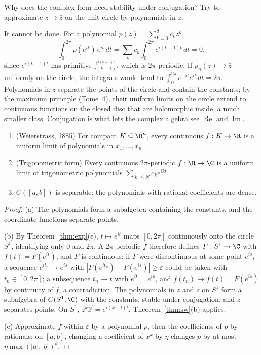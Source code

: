 \begin{think}
Why does the complex form need stability under conjugation? Try to approximate $z\mapsto\bar z$ on the unit circle by polynomials in $z$.
\end{think}

It cannot be done. For a polynomial $p(z)=\sum_{k=0}^dc_kz^k$,
\[\int_0^{2\pi}p(e^{it})\,e^{it}\,dt=\sum_kc_k\int_0^{2\pi}e^{i(k+1)t}\,dt=0,\]
since $e^{i(k+1)t}$ has primitive $\frac{e^{i(k+1)t}}{i(k+1)}$, which is $2\pi$-periodic. If $p_n(z)\to\bar z$ uniformly on the circle, the integrals would tend to
$\int_0^{2\pi}e^{-it}e^{it}\,dt=2\pi$. Polynomials in $z$ separate the points of the circle and contain the constants; by the maximum principle (Tome~4), their uniform limits on the circle
extend to continuous functions on the closed disc that are holomorphic inside, a much smaller class. Conjugation is what lets the complex
algebra see $\operatorname{Re}$ and $\operatorname{Im}$.

\begin{corollary}\label{cor:weierstrass}
\begin{enumerate}[label=(\alph*)]
\item (Weierstrass, 1885) For compact $K\subseteq\R^n$, every continuous $f:K\to\R$ is a uniform limit of polynomials in $x_1,\dots,x_n$.
\item (Trigonometric form) Every continuous $2\pi$-periodic $f:\R\to\C$ is a uniform limit of trigonometric polynomials $\sum_{|k|\le N}c_ke^{ikt}$.
\item $C([a,b])$ is separable: the polynomials with rational coefficients are dense.
\end{enumerate}
\end{corollary}
\begin{proof}
(a) The polynomials form a subalgebra containing the constants, and the coordinate functions separate points.

(b) By Theorem~\ref{thm:exp}(e), $t\mapsto e^{it}$ maps $[0,2\pi]$ continuously onto the circle $S^1$, identifying only $0$ and $2\pi$. A $2\pi$-periodic $f$ therefore defines
$F:S^1\to\C$ with $f(t)=F(e^{it})$, and $F$ is continuous: if $F$ were discontinuous at some point $e^{is}$, a sequence $e^{it_n}\to e^{is}$ with $|F(e^{it_n})-F(e^{is})|\ge\varepsilon$ could
be taken with $t_n\in[0,2\pi]$; a subsequence $t_n\to t$ with $e^{it}=e^{is}$, and $f(t_n)\to f(t)=F(e^{is})$ by continuity of $f$, a contradiction. The polynomials in $z$ and $\bar z$
on $S^1$ form a subalgebra of $C(S^1,\C)$ with the constants, stable under conjugation, and $z$ separates points. On $S^1$, $z^k\bar z^l=e^{i(k-l)t}$. Theorem~\ref{thm:sw}(b)
applies.

(c) Approximate $f$ within $\varepsilon$ by a polynomial $p$, then the coefficients of $p$ by rationals: on $[a,b]$, changing a coefficient of $x^k$ by $\eta$ changes $p$ by at most
$\eta\max(|a|,|b|)^k$.
\end{proof}

